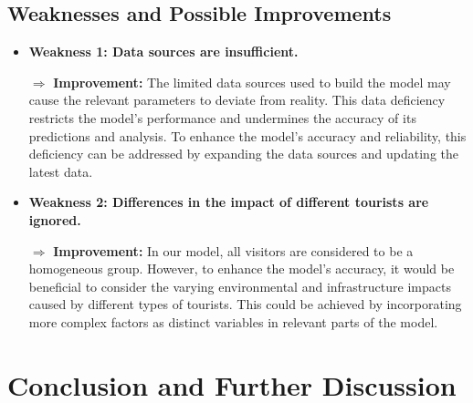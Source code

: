 \documentclass{mcmthesis}
\begin{document}
\subsection{Weaknesses and Possible Improvements}
\begin{itemize}
  \item \textbf{Weakness 1: Data sources are insufficient.}
  
  
  $\Rightarrow$ \textbf{Improvement:} {The limited data sources used to build the model may cause the relevant parameters to deviate from reality. This data deficiency restricts the model's performance and undermines the accuracy of its predictions and analysis.  To enhance the model's accuracy and reliability, this deficiency can be addressed by expanding the data sources and updating the latest data.}
  \item \textbf{Weakness 2: Differences in the impact of different tourists are ignored.}
  
  $\Rightarrow$ \textbf{Improvement:} {In our model, all visitors are considered to be a homogeneous group. However, to enhance the model's accuracy, it would be beneficial to consider the varying environmental and infrastructure impacts caused by different types of tourists. This could be achieved by incorporating more complex factors as distinct variables in relevant parts of the model.}
  \end{itemize}

\section{Conclusion and Further Discussion}
\end{document}
